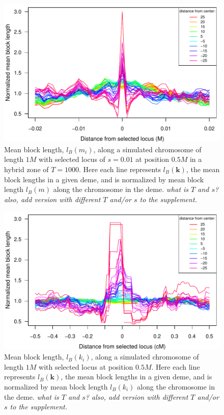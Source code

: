 \documentclass[11pt,letterpaper]{article}
\newcommand{\plr}[1]{{\em \color{blue} #1}}
\begin{document}
\begin{figure}
\includegraphics{figs/blocksAlongChromAncBConditioning}
\caption{Mean block length, $l_B(m_i)$, along a simulated chromosome of length $1M$ with selected locus of $s=0.01$ at position $0.5M$ in a hybrid zone of $T=1000$. Here each line represents  $l_B(\mathbf{k})$, the mean block lengths in a given deme, and is normalized by mean block length $l_B(m)$ along the chromosome in the deme.
    \plr{what is $T$ and $s$? also, add version with different $T$ and/or $s$ to the supplement.}
}\label{Fig:blockLengths}
\end{figure}



\begin{figure}
\includegraphics{figs/blocksAlongChromAncBConditioningHighRes}
\caption{Mean block length, $l_B(k_i)$, along a simulated chromosome of length $1M$ with selected locus at position $0.5M$. Here each line represents  $l_B(\mathbf{k})$, the mean block lengths in a given deme, and is normalized by mean block length $l_B(k_i)$ along the chromosome in the deme.
    \plr{what is $T$ and $s$? also, add version with different $T$ and/or $s$ to the supplement.}
}\label{Fig:blockLengths}
\end{figure}
\end{document}
